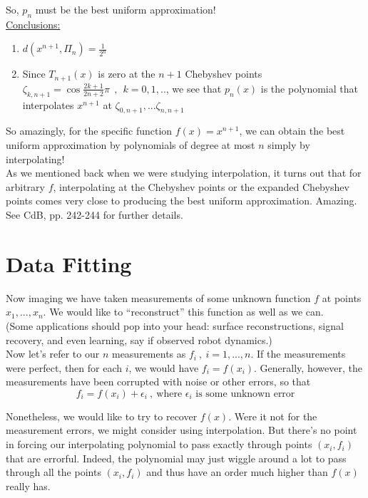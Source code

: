 {So, $p_n$ must be the best uniform approximation! \\

\underline{Conclusions:}
\begin{enumerate}
    \item $d(x^{n+1}, \Pi_n) = \frac{1}{2^n}$
    \item Since $T_{n+1}(x)$ is zero at the $n+1$ Chebyshev points $\zeta_{k, n+1} = \cos{ \frac{2k+1}{2n+2} \pi} ~~,~~k = 0,1, ..$, we see that $p_n(x)$ is the polynomial that interpolates $x^{n+1}$ at $\zeta_{0, n+1}, ... \zeta_{n, n+1}$
\end{enumerate}

So amazingly, for the specific function $f(x) = x^{n+1}$, we can obtain the best uniform approximation by polynomials of degree at most $n$ simply by interpolating! \\

As we mentioned back when we were studying interpolation, it turns out that for arbitrary $f$, interpolating at the Chebyshev points or the expanded Chebyshev points comes very close to producing the best uniform approximation. Amazing. \\

See CdB, pp. 242-244 for further details.

\newpage
\section{Data Fitting}

Now imaging we have taken measurements of some unknown function $f$ at points $x_1, ... , x_n$. We would like to ``reconstruct'' this function as well as we can.\\

(Some applications should pop into your head: surface reconstructions, signal recovery, and even learning, say if observed robot dynamics.)\\

Now let's refer to our $n$ measurements as $f_i~,~i = 1, ... ,n$. If the measurements were perfect, then for each $i$, we would have $f_i = f(x_i)$. Generally, however, the measurements have been corrupted with noise or other errors, so that
\begin{equation*}
    f_i = f(x_i) + \epsilon_i~,~\text{where } \epsilon_i \text{ is some unknown error}
\end{equation*}

Nonetheless, we would like to try to recover $f(x)$. Were it not for the measurement errors, we might consider using interpolation. But there's no point in forcing our interpolating polynomial to pass exactly through points $(x_i, f_i)$ that are errorful. Indeed, the polynomial may just wiggle around a lot to pass through all the points $(x_i, f_i)$ and thus have an order much higher than $f(x)$ really has. \\

}
